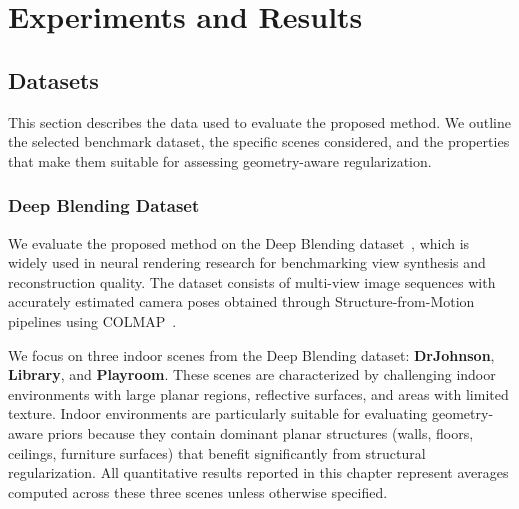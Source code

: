 \chapter{Experiments and Results}

\section{Datasets}

This section describes the data used to evaluate the proposed method. We outline the selected benchmark dataset, the specific scenes considered, and the properties that make them suitable for assessing geometry-aware regularization.

\subsection{Deep Blending Dataset}

We evaluate the proposed method on the Deep Blending dataset~\cite{hedman2018deepblending}, which is widely used in neural rendering research for benchmarking view synthesis and reconstruction quality. The dataset consists of multi-view image sequences with accurately estimated camera poses obtained through Structure-from-Motion pipelines using COLMAP~\cite{schoenberger2016sfm}.

We focus on three indoor scenes from the Deep Blending dataset: \textbf{DrJohnson}, \textbf{Library}, and \textbf{Playroom}. These scenes are characterized by challenging indoor environments with large planar regions, reflective surfaces, and areas with limited texture. Indoor environments are particularly suitable for evaluating geometry-aware priors because they contain dominant planar structures (walls, floors, ceilings, furniture surfaces) that benefit significantly from structural regularization. All quantitative results reported in this chapter represent averages computed across these three scenes unless otherwise specified.

